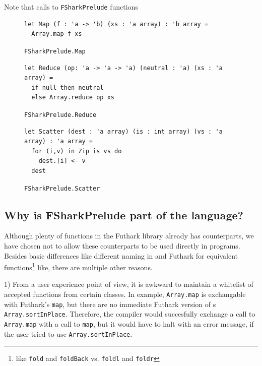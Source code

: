 Note that calls to \texttt{FSharkPrelude} functions 

\clearpage
\begin{figure}[H]
\centering
\begin{verbatim}
let Map (f : 'a -> 'b) (xs : 'a array) : 'b array =
  Array.map f xs
\end{verbatim}
\caption{\texttt{FSharkPrelude.Map}}
\label{fig:fsharkpreludemap}
\end{figure}

\begin{figure}[H]
\begin{verbatim}
let Reduce (op: 'a -> 'a -> 'a) (neutral : 'a) (xs : 'a array) =
  if null then neutral 
  else Array.reduce op xs
\end{verbatim}
\caption{\texttt{FSharkPrelude.Reduce}}
\label{fig:fsharkpreludereduce}
\end{figure}

\begin{figure}[H]
\begin{verbatim}
let Scatter (dest : 'a array) (is : int array) (vs : 'a array) : 'a array =
  for (i,v) in Zip is vs do
    dest.[i] <- v
  dest
\end{verbatim}
\caption{\texttt{FSharkPrelude.Scatter}}
\label{fig:fsharkpreludescatter}
\end{figure}
\clearpage

\subsection*{Why is FSharkPrelude part of the \fshark{} language?}
Although plenty of functions in the Futhark library already has \fsharp{}
counterparts, we have chosen not to allow these \fsharp{} counterparts to be
used directly in \fshark{} programs.
Besides basic differences like different naming in \fsharp{} and Futhark for
equivalent functions\footnote{like \texttt{fold} and \texttt{foldBack} vs.
  \texttt{foldl} and \texttt{foldr}} like, there are multiple other reasons.

1) From a user experience point of view, it is awkward to maintain a whitelist
of accepted functions from certain classes.
In example, \texttt{Array.map} is exchangable with Futhark's
\texttt{map}, but there are no immediate Futhark version of \fsharp{}s
\texttt{Array.sortInPlace}. Therefore, the \fshark{} compiler would succesfully
exchange a call to \texttt{Array.map} with a call to \texttt{map}, but it would
have to halt with an error message, if the user tried to use \texttt{Array.sortInPlace}.


